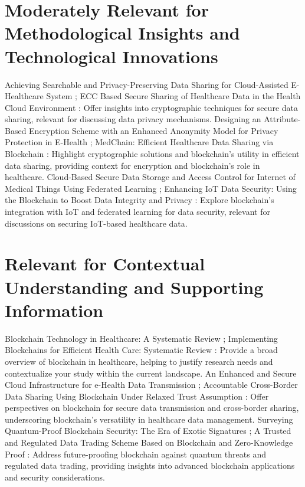 \documentclass[cic,tc,english]{iiufrgs}
\begin{document}
\section{Moderately Relevant for Methodological Insights and Technological Innovations}

    Achieving Searchable and Privacy-Preserving Data Sharing for Cloud-Assisted E-Healthcare System \cite{XuChang2019}; ECC Based Secure Sharing of Healthcare Data in the Health Cloud Environment \cite{sri2019}: Offer insights into cryptographic techniques for secure data sharing, relevant for discussing data privacy mechanisms.
    Designing an Attribute-Based Encryption Scheme with an Enhanced Anonymity Model for Privacy Protection in E-Health \cite{Zala2024}; MedChain: Efficient Healthcare Data Sharing via Blockchain \cite{Shen2019}: Highlight cryptographic solutions and blockchain’s utility in efficient data sharing, providing context for encryption and blockchain's role in healthcare.
    Cloud-Based Secure Data Storage and Access Control for Internet of Medical Things Using Federated Learning \cite{Bhansali2022}; Enhancing IoT Data Security: Using the Blockchain to Boost Data Integrity and Privacy \cite{Eghmazi2024}: Explore blockchain's integration with IoT and federated learning for data security, relevant for discussions on securing IoT-based healthcare data.

\section{Relevant for Contextual Understanding and Supporting Information}

    Blockchain Technology in Healthcare: A Systematic Review \cite{Saeed2022}; Implementing Blockchains for Efficient Health Care: Systematic Review \cite{Vazirani2019}: Provide a broad overview of blockchain in healthcare, helping to justify research needs and contextualize your study within the current landscape.
    An Enhanced and Secure Cloud Infrastructure for e-Health Data Transmission \cite{Memos2021}; Accountable Cross-Border Data Sharing Using Blockchain Under Relaxed Trust Assumption \cite{Rahman2020}: Offer perspectives on blockchain for secure data transmission and cross-border sharing, underscoring blockchain's versatility in healthcare data management.
    Surveying Quantum-Proof Blockchain Security: The Era of Exotic Signatures \cite{Naz2024}; A Trusted and Regulated Data Trading Scheme Based on Blockchain and Zero-Knowledge Proof \cite{Li2024}: Address future-proofing blockchain against quantum threats and regulated data trading, providing insights into advanced blockchain applications and security considerations.
\end{document}
